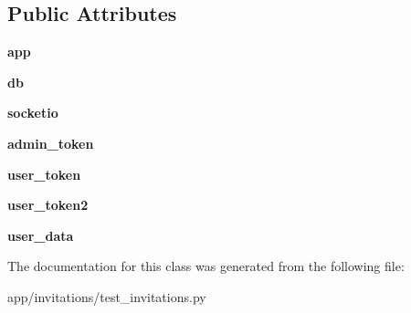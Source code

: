 \subsection*{Public Attributes}
\begin{DoxyCompactItemize}
\item 
\mbox{\label{classapp_1_1invitations_1_1test__invitations_1_1_test_invitations_a9b6d5e7074f73dcd75c88c898659aedf}} 
{\bfseries app}
\item 
\mbox{\label{classapp_1_1invitations_1_1test__invitations_1_1_test_invitations_ab3f7b1f7ad8936c87a3f5c4398ed67de}} 
{\bfseries db}
\item 
\mbox{\label{classapp_1_1invitations_1_1test__invitations_1_1_test_invitations_a49ff15ee2e74f017e25e76c3677ee306}} 
{\bfseries socketio}
\item 
\mbox{\label{classapp_1_1invitations_1_1test__invitations_1_1_test_invitations_a1d343d77eda9b5cc28f2974de88eeb60}} 
{\bfseries admin\+\_\+token}
\item 
\mbox{\label{classapp_1_1invitations_1_1test__invitations_1_1_test_invitations_aa5e0b5351ec9a07b4c38f152e4780d1d}} 
{\bfseries user\+\_\+token}
\item 
\mbox{\label{classapp_1_1invitations_1_1test__invitations_1_1_test_invitations_a1b97c79839d299106f0701f49b9b848a}} 
{\bfseries user\+\_\+token2}
\item 
\mbox{\label{classapp_1_1invitations_1_1test__invitations_1_1_test_invitations_a7908191ae15118ca83e76f91d53684b8}} 
{\bfseries user\+\_\+data}
\end{DoxyCompactItemize}


The documentation for this class was generated from the following file\+:\begin{DoxyCompactItemize}
\item 
app/invitations/test\+\_\+invitations.\+py\end{DoxyCompactItemize}
